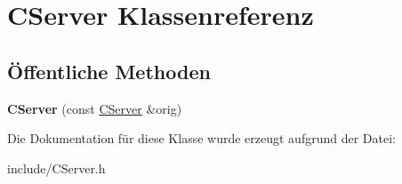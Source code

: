\hypertarget{class_c_server}{\section{\-C\-Server \-Klassenreferenz}
\label{class_c_server}
}
\subsection*{Öffentliche \-Methoden}
\begin{DoxyCompactItemize}
\item 
\hypertarget{class_c_server_a2476065c420d1c8a00102fe521172edf}{{\bfseries \-C\-Server} (const \hyperlink{class_c_server}{\-C\-Server} \&orig)}\label{class_c_server_a2476065c420d1c8a00102fe521172edf}

\end{DoxyCompactItemize}


\-Die \-Dokumentation für diese \-Klasse wurde erzeugt aufgrund der \-Datei\-:\begin{DoxyCompactItemize}
\item 
include/\-C\-Server.\-h\end{DoxyCompactItemize}
